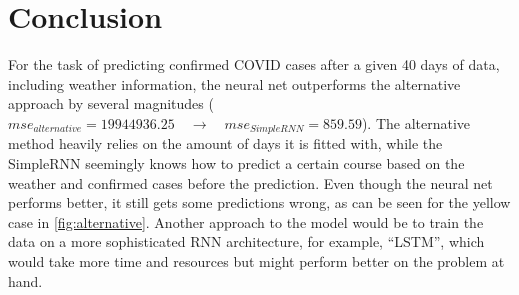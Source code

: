 \section{Conclusion}

For the task of predicting confirmed COVID cases after a given 40 days of data, including weather information, the neural net outperforms the alternative approach by several magnitudes ($mse_{alternative} = 19944936.25 \quad \to \quad mse_{SimpleRNN} = 859.59$).
The alternative method heavily relies on the amount of days it is fitted with, while the SimpleRNN seemingly knows how to predict a certain course based on the weather and confirmed cases before the prediction. Even though the neural net performs better, it still gets some predictions wrong, as can be seen for the yellow case in \ref{fig:alternative}.
Another approach to the model would be to train the data on a more sophisticated RNN architecture, for example, \enquote{LSTM}, which would take more time and resources but might perform better on the problem at hand.